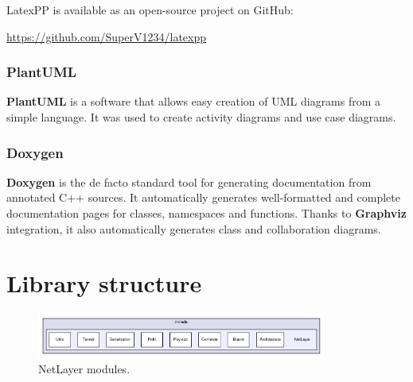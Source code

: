 \documentclass[11pt]{report}
\newcommand{\+}{\discretionary{\mbox{\scriptsize$\hookleftarrow$}}{}{}}
\renewcommand\emph{\textbf}
\begin{document}
                    LatexPP is available as an open-source project on GitHub:

                    \url{https://github.com/SuperV1234/latexpp}

                \subsection{PlantUML}
                    \emph{PlantUML} is a software that allows easy creation of UML diagrams from a simple language. It was used to create activity diagrams and use case diagrams.

                \subsection{Doxygen}
                    \emph{Doxygen} is the de facto standard tool for generating documentation from annotated C++ sources. It automatically generates well-formatted and complete documentation pages for classes, namespaces and functions. Thanks to \emph{Graphviz} integration, it also automatically generates class and collaboration diagrams.

\chapter{Library structure}

    \begin{figure}[!htb]
    \caption{NetLayer modules.}
    \centering
    \includegraphics[width=0.85\textwidth]{inc/0.png}
    \end{figure}
\end{document}
